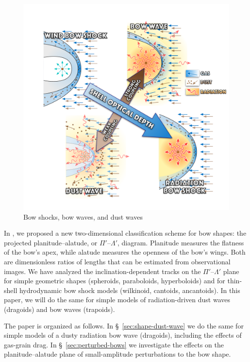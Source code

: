 \begin{figure}
  \centering
  \includegraphics[width=\linewidth]{figs/bows-and-waves}
  \caption{Bow shocks, bow waves, and dust waves}
  \label{fig:3-types-bow}
\end{figure}

In \citet[][hereafter \PaperI{}]{Tarango-Yong:2018a}, we proposed a
new two-dimensional classification scheme for bow shapes: the
projected planitude--alatude, or \(\Pi'\)--\(\Lambda'\), diagram.  Planitude
measures the flatness of the bow's apex, while alatude measures the
openness of the bow's wings.  Both are dimensionless ratios of lengths
that can be estimated from observational images.  We have analyzed the
inclination-dependent tracks on the \(\Pi'\)--\(\Lambda'\) plane for simple
geometric shapes (spheroids, paraboloids, hyperboloids) and for
thin-shell hydrodynamic bow shock models (wilkinoid, cantoids,
ancantoids).  In this paper, we will do the same for simple models of
radiation-driven dust waves (dragoids) and bow waves (trapoids).

The paper is organized as follows.
%
In \S~\ref{sec:shape-dust-wave} we do the same for simple models of a
dusty radiation bow wave (dragoids), including the effects of
gas-grain drag.
%
In \S~\ref{sec:perturbed-bows} we investigate the effects on the
planitude--alatude plane of small-amplitude perturbations to the bow
shape.
%


